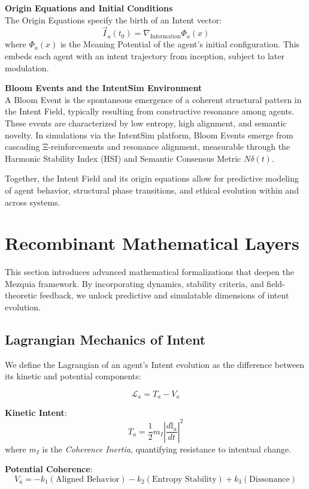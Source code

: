 \documentclass[12pt]{article}
\begin{document}
\textbf{Origin Equations and Initial Conditions} \\
The Origin Equations specify the birth of an Intent vector:
\[
\vec{I}_a(t_0) = \nabla_{\text{Information}} \Phi_a(x)
\]
where \(\Phi_a(x)\) is the Meaning Potential of the agent’s initial configuration. This embeds each agent with an intent trajectory from inception, subject to later modulation.

\textbf{Bloom Events and the IntentSim Environment} \\
A Bloom Event is the spontaneous emergence of a coherent structural pattern in the Intent Field, typically resulting from constructive resonance among agents. These events are characterized by low entropy, high alignment, and semantic novelty. In simulations via the IntentSim platform, Bloom Events emerge from cascading Ξ-reinforcements and resonance alignment, measurable through the Harmonic Stability Index (HSI) and Semantic Consensus Metric \(N\delta(t)\).

Together, the Intent Field and its origin equations allow for predictive modeling of agent behavior, structural phase transitions, and ethical evolution within and across systems.

\section{Recombinant Mathematical Layers}

This section introduces advanced mathematical formalizations that deepen the Mezquia framework. By incorporating dynamics, stability criteria, and field-theoretic feedback, we unlock predictive and simulatable dimensions of intent evolution.

\subsection{Lagrangian Mechanics of Intent}

We define the Lagrangian of an agent's Intent evolution as the difference between its kinetic and potential components:

\[
\mathcal{L}_a = T_a - V_a
\]

\textbf{Kinetic Intent}:
\[
T_a = \frac{1}{2} m_I \left| \frac{d\mathbb{I}_a}{dt} \right|^2
\]
where \(m_I\) is the \emph{Coherence Inertia}, quantifying resistance to intentual change.

\textbf{Potential Coherence}:
\[
V_a = -k_1 (\text{Aligned Behavior}) - k_2 (\text{Entropy Stability}) + k_3 (\text{Dissonance})
\]
\end{document}
